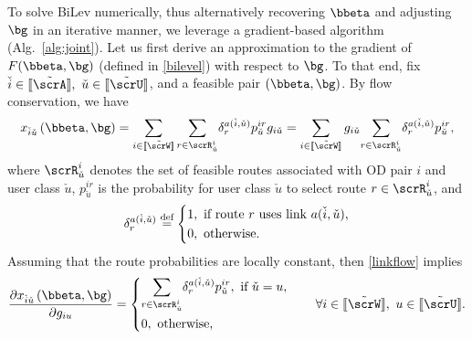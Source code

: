 \documentclass[3p]{elsarticle}
\newcommand*{\defeq}{\stackrel{\text{def}}{=}}
\begin{document}
To solve BiLev numerically, thus alternatively recovering $\bbeta$ and
adjusting $\bg$ in an iterative manner, we leverage a gradient-based
algorithm (Alg.~\ref{alg:joint}). Let us first derive an approximation
to the gradient of $F(\bbeta,\bg)$ (defined in \eqref{bilevel}) with
respect to $\bg$. To that end, fix $\check{i} \in [\kern-0.15em[ \tilde
\scrA ]\kern-0.15em], ~\check{u} \in [\kern-0.15em[ \tilde \scrU
]\kern-0.15em]$, and a feasible pair $(\bbeta, \bg)$.  By flow
conservation, we have
\begin{align}
	{x_{\check{i}\check{u}}}\left( {\bbeta ,\bg} \right) = \sum\limits_{i \in [\kern-0.15em[ \tilde \scrW 
			]\kern-0.15em]} {\sum\limits_{r \in {\scrR^i_{\check u}}}} {\delta_r^{a(\check{i},\check{u})} p_{\check{u}}^{ir}g_{i\check{u}} }  = \sum\limits_{i \in [\kern-0.15em[ \tilde \scrW 
			]\kern-0.15em]}g_{i\check{u}} {\sum\limits_{r \in {\scrR^i_{\check u}}}} {\delta_r^{a(\check{i},\check{u})} p_{\check{u}}^{ir} },   \label{linkflow}
\end{align}
where ${\scrR^i_{\check u}}$ denotes the set of feasible routes
associated with OD pair $i$ and user class $\check u$,
$p_{\check{u}}^{ir}$ is the probability for user class $\check{u}$ to
select route $r \in {\scrR^i_{\check u}}$, and
\begin{align}
	\delta_r^{a(\check{i},\check{u})} \defeq \left\{ \begin{gathered}
	1,{\text{ if route }} r \text{ uses link } a(\check{i},\check{u}), \hfill \\
	0,{\text{ otherwise}}{\text{.}} \hfill \\  
	\end{gathered}  \right.   \label{delta}
	\end{align}
	Assuming that the route probabilities are locally constant, then \eqref{linkflow} implies \cite{noriega2007multi, spiess1990gradient}
		\begin{align}
		\frac{{\partial {x_{\check i \check u}}\left(\bbeta, \bg  \right)}}{{\partial {g _{iu}}}} = \left\{ \begin{gathered}
		{\sum\limits_{r \in {\scrR^i_{\check u}}}} {\delta_r^{a(\check{i},\check{u})} p_{\check{u}}^{ir} },{\text{ if }} \check{u} = u, \hfill \\
		0,{\text{ otherwise}}{\text{,}} \hfill \\  
		\end{gathered}  \right. 
		\qquad \forall {i} \in [\kern-0.15em[ \tilde \scrW 
		]\kern-0.15em], ~{u} \in [\kern-0.15em[ \tilde \scrU 
		]\kern-0.15em].  \label{jacobtmp}
\end{align}
\end{document}
